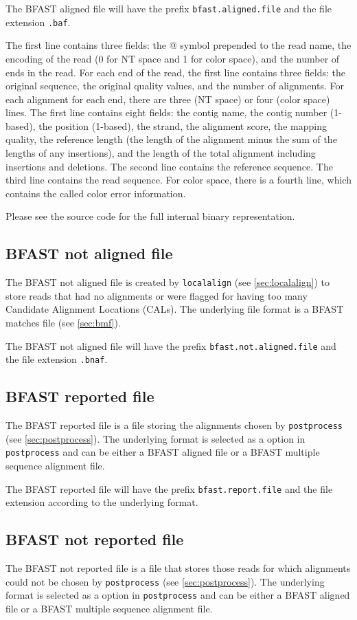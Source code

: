 \documentclass[a4paper,12pt]{book}
\newcommand{\TT}[1]{{\tt #1}} %
\newcommand{\BMF}{BFAST matches file} %
\newcommand{\BAF}{BFAST aligned file} %
\newcommand{\BNAF}{BFAST not aligned file} %
\newcommand{\BRF}{BFAST reported file} %
\newcommand{\BNRF}{BFAST not reported file} %
\newcommand{\BMAF}{BFAST multiple sequence alignment file} %
\begin{document}
The \BAF{} will have the prefix \TT{bfast.aligned.file} and the file extension \TT{.baf}.

The first line contains three fields: the @ symbol prepended to the read name, the encoding of the read (0 for NT space and 1 for color space), and the number of ends in the read.
For each end of the read, the first line contains three fields: the original sequence, the original quality values, and the number of alignments.
For each alignment for each end, there are three (NT space) or four (color space) lines.
The first line contains eight fields: the contig name, the contig number (1-based), the position (1-based), the strand, the alignment score, the mapping quality, the reference length (the length of the alignment minus the sum of the lengths of any insertions), and the length of the total alignment including insertions and deletions.
The second line contains the reference sequence.
The third line contains the read sequence.
For color space, there is a fourth line, which contains the called color error information.

Please see the source code for the full internal binary representation.

\subsection{\BNAF{}}
\label{sec:bnaf}
The \BNAF{} is created by \TT{localalign} (see \autoref{sec:localalign}) to store reads that had no alignments or were flagged for having too many Candidate Alignment Locations (CALs).
The underlying file format is a \BMF{} (see \autoref{sec:bmf}).

The \BNAF{} will have the prefix \TT{bfast.not.aligned.file} and the file extension \TT{.bnaf}.

\subsection{\BRF{}}
\label{sec:brf}
The \BRF{} is a file storing the alignments chosen by \TT{postprocess} (see \autoref{sec:postprocess}).
The underlying format is selected as a option in \TT{postprocess} and can be either a \BAF{} or a \BMAF{}.

The \BRF{} will have the prefix \TT{bfast.report.file} and the file extension according to the underlying format.

\subsection{\BNRF{}}
\label{sec:bnrf}
The \BNRF{} is a file that stores those reads for which alignments could not be chosen by \TT{postprocess} (see \autoref{sec:postprocess}).
The underlying format is selected as a option in \TT{postprocess} and can be either a \BAF{} or a \BMAF{}.
\end{document}

